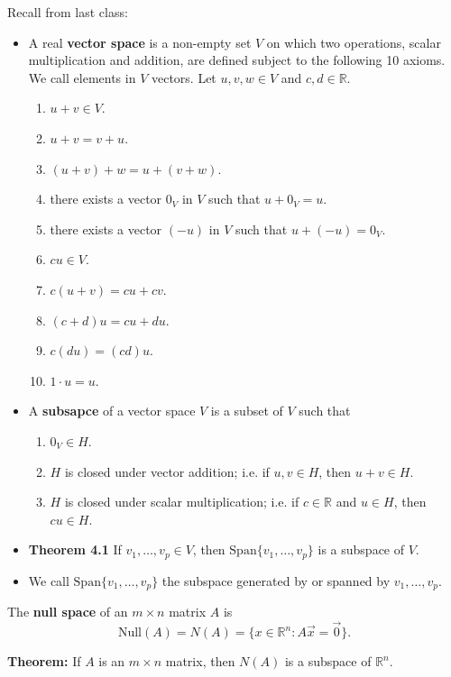 \documentclass[12pt,letterpaper]{article}
\begin{document}
\thispagestyle{fancy}

Recall from last class:

\begin{itemize}
\item A real {\bf vector space} is a non-empty set $V$ on which two operations, scalar multiplication and addition, are defined subject to the following 10 axioms. We call elements in $V$ vectors. Let $u,v,w \in V$ and $c,d\in \mathbb{R}$.
\begin{enumerate}
\item $u+v \in V$.
\item $u+v=v+u$.
\item $(u+v)+w=u+(v+w)$.
\item there exists a vector $0_V$ in $V$ such that $u+0_V=u$.
\item there exists a vector $(-u)$ in $V$ such that $u+(-u)=0_V$.
\item $cu \in V$.
\item $c(u+v)=cu+cv$.
\item $(c+d)u=cu+du$.
\item $c(du)=(cd)u$.
\item $1\cdot u =u$.
\end{enumerate}
\item A {\bf subsapce} of a vector space $V$ is a subset of $V$ such that
\begin{enumerate}
\item $0_V \in H$.
\item $H$ is closed under vector addition; i.e. if $u, v \in H$, then $u+v \in H$.
\item $H$ is closed under scalar multiplication; i.e. if $c \in \mathbb{R}$ and $u \in H$, then $cu \in H$.
\end{enumerate}
\item {\bf Theorem 4.1} If $v_1, \dots, v_p \in V$, then $\text{Span}\{v_1 ,\dots, v_p\}$ is a subspace of $V$. 
\item We call $\text{Span}\{v_1 ,\dots, v_p\}$ the subspace generated by or spanned by $v_1,\dots, v_p$.
\end{itemize}

\newpage

\begin{defn}
	The {\bf null space} of an $m \times n$ matrix $A$ is $$\text{Null}(A)=N(A)=\{x \in \mathbb{R}^n : A\vec{x}=\vec{0}\}.$$
\end{defn}

{\bf Theorem:} If $A$ is an $m\times n$ matrix, then $N(A)$ is a subspace of $\mathbb{R}^n$.
\end{document}
